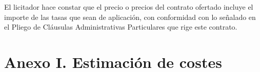 \documentclass{article}
\begin{document}
El licitador hace constar que el precio o precios del contrato ofertado incluye el importe de las tasas que sean de aplicación, con conformidad con lo señalado en el Pliego de Cláusulas Administrativas Particulares que rige este contrato. 
\newpage
\section*{Anexo I. Estimación de costes}
\begin{figure}[H]
	\hspace*{-3.5cm}
\end{figure}
\end{document}
